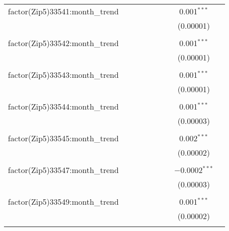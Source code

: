 \begin{table}[H]
{\begin{tabular}{@{\extracolsep{5pt}}lcccccccc}
  factor(Zip5)33541:month\_trend &  &  &  &  &  &  & 0.001$^{***}$ &  \\  

   &  &  &  &  &  &  & (0.00001) &  \\  

   & & & & & & & & \\  

  factor(Zip5)33542:month\_trend &  &  &  &  &  &  & 0.001$^{***}$ &  \\  

   &  &  &  &  &  &  & (0.00001) &  \\  

   & & & & & & & & \\  

  factor(Zip5)33543:month\_trend &  &  &  &  &  &  & 0.001$^{***}$ &  \\  

   &  &  &  &  &  &  & (0.00001) &  \\  

   & & & & & & & & \\  

  factor(Zip5)33544:month\_trend &  &  &  &  &  &  & 0.001$^{***}$ &  \\  

   &  &  &  &  &  &  & (0.00003) &  \\  

   & & & & & & & & \\  

  factor(Zip5)33545:month\_trend &  &  &  &  &  &  & 0.002$^{***}$ &  \\  

   &  &  &  &  &  &  & (0.00002) &  \\  

   & & & & & & & & \\  

  factor(Zip5)33547:month\_trend &  &  &  &  &  &  & $-$0.0002$^{***}$ &  \\  

   &  &  &  &  &  &  & (0.00003) &  \\  

   & & & & & & & & \\  

  factor(Zip5)33549:month\_trend &  &  &  &  &  &  & 0.001$^{***}$ &  \\  

   &  &  &  &  &  &  & (0.00002) &  \\  

   & & & & & & & & \\  


\end{tabular}}
\end{table}
